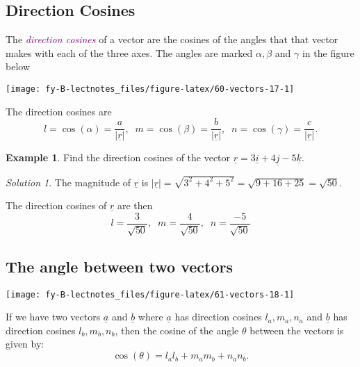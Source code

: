 \documentclass[
  english,
  11pt,
  oneside]{book}
\newcommand{\slide}{}
\theoremstyle{definition}
\theoremstyle{definition}
\newtheorem{example}{Example}[chapter]
\theoremstyle{definition}
\theoremstyle{definition}
\theoremstyle{remark}
\newtheorem*{solution}{Solution}
\begin{document}
\slide

\subsection{Direction Cosines}\label{direction-cosines}

The \textcolor{purple}{\em direction cosines} of a vector are the cosines of the angles that that vector makes with each of
the three axes. The angles are marked \(\alpha, \beta\) and \(\gamma\) in the figure below

\begin{center}\texttt{[image: fy-B-lectnotes\_files/figure-latex/60-vectors-17-1]} \end{center}

The direction cosines are
\[
l = \cos(\alpha) = \frac{a}{|\underline r|},\;\;m = \cos(\beta) = \frac{b}{|\underline r|},\;\;n = \cos(\gamma) = \frac{c}{|\underline r|}.
\]
\slide

\begin{example}
Find the direction cosines of the vector \(\underline r = 3\underline i + 4\underline j - 5\underline k\).
\end{example}

\begin{solution}
The magnitude of \(\underline r\) is \(|\underline r| = \sqrt{3^2+4^2+5^2} = \sqrt{9+16+25} = \sqrt{50}\).

The direction cosines of \(\underline r\) are then
\[
l = \frac{3}{\sqrt{50}},\;\;m = \frac{4}{\sqrt{50}},\;\;n = \frac{-5}{\sqrt{50}}
\]
\end{solution}

\slide

\subsection{The angle between two vectors}\label{the-angle-between-two-vectors}

\begin{center}\texttt{[image: fy-B-lectnotes\_files/figure-latex/61-vectors-18-1]} \end{center}

If we have two vectors \(\underline a\) and \(\underline b\) where \(\underline a\) has direction cosines \(l_a, m_a, n_a\) and \(\underline b\) has direction cosines \(l_b, m_b, n_b\), then the cosine of the angle \(\theta\) between the vectors is given by:
\[
\cos(\theta) = l_al_b + m_am_b + n_an_b.
\]
\slide
\end{document}
